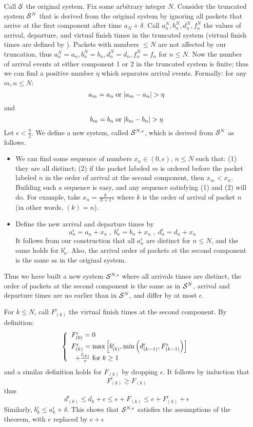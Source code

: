 Call $\mathcal S$ the original system. Fix some arbitrary integer
$N$. Consider the truncated system $\mathcal S^N$ that is derived
from the original system by ignoring all packets that arrive
at the first component after time $a_N + \delta$. Call $a^N_n,
b^N_n, d^N_n, f^N_n$ the values of arrival, departure, and
virtual finish times in the truncated system (virtual finish
times are defined by ). Packets with numbers
$\leq N$ are not affected by our truncation, thus $a^N_n=a_n,
b^N_n=b_n, d^N_n=d_n, f^N_n=f_n$ for $n \leq N$. Now the
number of arrival events at either component 1 or 2 in the
truncated system is finite; thus we can find a positive number
$\eta$ which separates arrival events. Formally: for any $m,n
\leq N$:
$$a_m=a_n \mor |a_m -a_n|> \eta$$
and
$$b_m=b_n \mor |b_m -b_n|> \eta$$
Let $\epsilon < \frac{\eta}{2}$. We define a new system,
called $\mathcal S^{N,\epsilon}$, which is derived from $\mathcal S^N$
as follows.
\begin{itemize}
  \item We can find some sequence of numbers $x_n \in (0, \epsilon)$,
  $n\leq N$ such that:  (1) they are all distinct; (2) if the
  packet
  labeled $m$ is ordered before the packet labeled  $n$ in the order of arrival
  at the second
  component, then $x_m < x_n$. Building such a sequence is easy,
  and any sequence satisfying (1) and (2) will do. For example, take
  $x_n =\frac{k}{N+1}
  \epsilon$ where $k$ is the order of arrival of packet $n$ (in other words, $(k)=n$).
  \item Define the new arrival and departure times by
  $$
  a_n^{\epsilon}= a_n + x_n \; , \;
  b_n^{\epsilon}= b_n + x_n \; , \;
  d_n^{\epsilon}= d_n + x_n
  $$
It follows from our construction that all $a_n^{\epsilon}$ are
distinct for $n\leq N$,
  and the same holds for $b_n^{\epsilon}$. Also, the arrival order of
  packets at the second component is the same as in the original system.
  \end{itemize}
Thus we have built a new system $\mathcal S^{N,\epsilon}$ where all
arrivals times are distinct, the order of packets at the
second component is the same as in $\mathcal S^{N}$, arrival and
departure times are no earlier than in $\mathcal S^{N}$, and differ
by at most $\epsilon$.

For $k \leq N$, call $F_{(k)}^{\epsilon}$ the virtual finish
times at the second component. By definition:
$$
\left\{\begin{array}{l} 
 F_{(0)}^{\epsilon} =0\\
 F_{(k)}^{\epsilon}= \max \left[
 b_{(k)}^{\epsilon}, \min \left(d_{(k-1)}^{\epsilon}, F_{(k-1)}^{\epsilon} \right)\right]
 \\ \;\;+ \frac{l_{(k)}}{r} \mathrm{\; for \; }
 k \geq 1
  \end{array} \right.
$$
and a similar definition holds for $F_{(k)}$ by dropping
$\epsilon$. It follows by induction that
$$
F_{(k)}^{\epsilon} \geq  F_{(k)}
$$
thus
$$ d_{(k)}^{\epsilon} \leq d_k +  \epsilon  \leq e+ F_{(k)}
\leq e+ F_{(k)}^{\epsilon} +
  \epsilon $$
Similarly, $b_{k}^{\epsilon} \leq a_k^{\epsilon} + \delta$.
This shows that $\mathcal S^{N,\epsilon}$ satisfies the assumptions
of the theorem, with $e$ replaced by $e+
  \epsilon$

